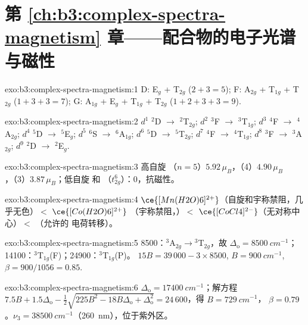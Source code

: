 \section*{第 \ref{ch:b3:complex-spectra-magnetism} 章——配合物的电子光谱与磁性}

\begin{solution}{exo:b3:complex-spectra-magnetism:1}
D: E$_g$ + T$_{2g}$ ($2 + 3 = 5$); F: A$_{2g}$ + T$_{1g}$ + T$_{2g}$ ($1 + 3 + 3 = 7$); G: A$_{1g}$ + E$_g$ + T$_{1g}$ + T$_{2g}$
($1 + 2 + 3 + 3 = 9$).
\end{solution}

\begin{solution}{exo:b3:complex-spectra-magnetism:2}
$d^1$ $^2$D $\to$ $^2$T$_{2g}$; $d^2$ $^3$F $\to$ $^3$T$_{1g}$; $d^3$ $^4$F $\to$ $^4$A$_{2g}$; $d^4$ $^5$D $\to$ $^5$E$_g$; $d^5$ $^6$S $\to$ $^6$A$_{1g}$; $d^6$ $^5$D
$\to$ $^5$T$_{2g}$; $d^7$ $^4$F $\to$ $^4$T$_{1g}$; $d^8$ $^3$F $\to$ $^3$A$_{2g}$; $d^9$ $^2$D $\to$ $^2$E$_g$.
\end{solution}

\begin{solution}{exo:b3:complex-spectra-magnetism:3}
高自旋 （$n = 5$）$5.92\,\mu_B$，（4）$4.90\,\mu_B$，（3）$3.87\,\mu_B$；低自旋  和
（$t_{2g}^6$）：0，抗磁性。
\end{solution}

\begin{solution}{exo:b3:complex-spectra-magnetism:4}
$\ce{[Mn(H2O)6]^{2+}}$（自旋和宇称禁阻，几乎无色）$<$ $\ce{[Co(H2O)6]^{2+}}$
（宇称禁阻，）$<$ $\ce{[CoCl4]^{2-}}$（无对称中心）$<$ （允许的
电荷转移）。
\end{solution}

\begin{solution}{exo:b3:complex-spectra-magnetism:5}
8500：$^3$A$_{2g}\to{}^3$T$_{2g}$，故 $\Delta_{\mathrm o} = \qty{8500}{cm^{-1}}$；14100：$^3$T$_{1g}$(F)；24900：$^3$T$_{1g}$(P)。
$15B = 39\,000 - 3 \times 8500$, $B = \qty{900}{cm^{-1}}$, $\beta = 900/1056 = 0.85$.
\end{solution}

\begin{solution}{exo:b3:complex-spectra-magnetism:6}
$\Delta_{\mathrm o} = \qty{17400}{cm^{-1}}$；解方程 $7.5B + 1.5\Delta_{\mathrm o} - \frac12\sqrt{225B^2 - 18B\Delta_{\mathrm o} + \Delta_{\mathrm o}^2} = 24\,600$，得 $B = \qty{729}{cm^{-1}}$，
$\beta = 0.79$。$\nu_3 = \qty{38500}{cm^{-1}}$（\qty{260}{nm}），位于紫外区。
\end{solution}

